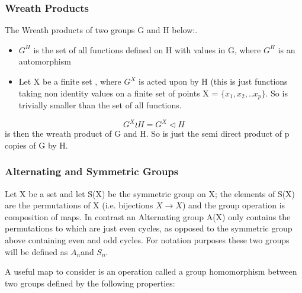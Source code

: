 \documentclass{article}
\begin{document}
\subsubsection*{Wreath Products}

The Wreath products of two groups G and H below:.
\begin{itemize}
	\item $G^{H}$ is the set of all functions defined on H with values in G, where $G^{H}$ is an automorphism 
    \item Let X be a finite set , where $G^{X}$ is acted upon by H (this is just functions taking non identity values on a finite set of points X = $\{x_{1},x_{2},.. x_{p}\}$. So is trivially smaller than the set of all functions.
\end{itemize}
\begin{equation}
	G^{X} \wr  H = G^{X} \triangleleft H
\end{equation}
is then the wreath product of G and H. So is just the semi direct product of p copies of G by H.%

\paragraph*{}
\newpage
\subsubsection*{Alternating and Symmetric Groups}
Let X be a set and let S(X) be the symmetric group on X; the elements of S(X)
are the permutations of X (i.e. bijections $X\rightarrow X$) and the group operation is
composition of maps.
In contrast an Alternating group A(X) only contains the permutations to which are just even cycles, as opposed to the symmetric group above containing even and odd cycles.  For notation purposes these two groups will be defined as $A_{n} $and $S_{n}$. 



A useful map to consider is an operation called a group homomorphism between two groups defined by the following properties:
\end{document}
